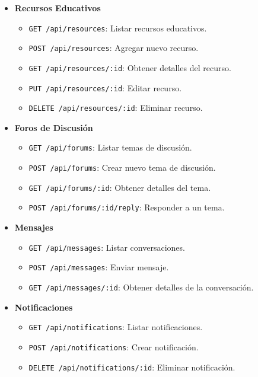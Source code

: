 \begin{itemize}
    \item \textbf{Recursos Educativos}
    \begin{itemize}
        \item \texttt{GET /api/resources}: Listar recursos educativos.
        \item \texttt{POST /api/resources}: Agregar nuevo recurso.
        \item \texttt{GET /api/resources/:id}: Obtener detalles del recurso.
        \item \texttt{PUT /api/resources/:id}: Editar recurso.
        \item \texttt{DELETE /api/resources/:id}: Eliminar recurso.
    \end{itemize}

    \item \textbf{Foros de Discusión}
    \begin{itemize}
        \item \texttt{GET /api/forums}: Listar temas de discusión.
        \item \texttt{POST /api/forums}: Crear nuevo tema de discusión.
        \item \texttt{GET /api/forums/:id}: Obtener detalles del tema.
        \item \texttt{POST /api/forums/:id/reply}: Responder a un tema.
    \end{itemize}

    \item \textbf{Mensajes}
    \begin{itemize}
        \item \texttt{GET /api/messages}: Listar conversaciones.
        \item \texttt{POST /api/messages}: Enviar mensaje.
        \item \texttt{GET /api/messages/:id}: Obtener detalles de la conversación.
    \end{itemize}

    \item \textbf{Notificaciones}
    \begin{itemize}
        \item \texttt{GET /api/notifications}: Listar notificaciones.
        \item \texttt{POST /api/notifications}: Crear notificación.
        \item \texttt{DELETE /api/notifications/:id}: Eliminar notificación.
    \end{itemize}
\end{itemize}

